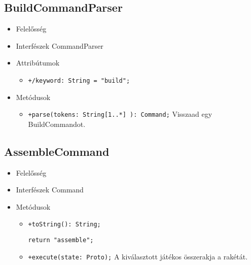 \subsection{BuildCommandParser}
\begin{itemize}
\item Felelősség\newline
\item Interfészek\newline
CommandParser
\item Attribútumok
	\begin{itemize}
		\item \texttt{+/keyword: String = "build";}
	\end{itemize}
\item Metódusok
\begin{itemize}
		\item \texttt{+parse(tokens: String[1..*] ): Command;} \newline
		Visszaad egy BuildCommandot.
	\end{itemize}
\end{itemize}

\subsection{AssembleCommand}
\begin{itemize}
\item Felelősség\newline
\item Interfészek\newline
Command
\item Metódusok
\begin{itemize}
		\item \texttt{+toString(): String;}
		\begin{lstlisting}
return "assemble";
		\end{lstlisting}
		\item \texttt{+execute(state: Proto);} \newline
		A kiválasztott játékos összerakja a rakétát.
	\end{itemize}
\end{itemize}

